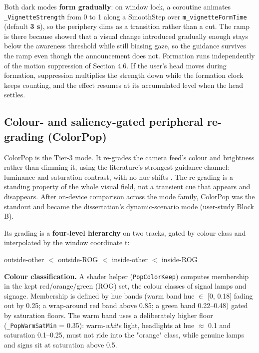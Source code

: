 Both dark modes \textbf{form gradually}: on window lock, a coroutine animates \verb|_VignetteStrength| from 0
to 1 along a SmoothStep over \verb|m_vignetteFormTime| (default \textbf{3 s}), so the periphery dims as a
transition rather than a cut. The ramp is there because \citet{hata2016} showed that a
visual change introduced gradually enough stays below the awareness threshold while still biasing
gaze, so the guidance survives the ramp even though the announcement does not. Formation runs independently of the motion suppression of Section 4.6.
If the user's head moves during formation, suppression multiplies the strength down while the
formation clock keeps counting, and the effect resumes at its accumulated level when the head
settles.

\subsection{Colour- and saliency-gated peripheral re-grading (ColorPop)}

ColorPop is the Tier-3 mode. It re-grades the camera feed's colour and brightness rather than
dimming it, using the literature's strongest guidance channel: luminance and saturation contrast,
with no hue shifts \citep{bailey2009,grogorick2017,sutton2022}. The re-grading
is a standing property of the whole visual field, not a transient cue that appears and disappears.
After on-device comparison across the mode family, ColorPop was the standout and became the
dissertation's dynamic-scenario mode (user-study Block B).

Its grading is a \textbf{four-level hierarchy} on two tracks, gated by colour class and interpolated by
the window coordinate t:

\begin{center}
outside-other $<$ outside-ROG $<$ inside-other $<$ inside-ROG
\end{center}

\textbf{Colour classification.} A shader helper (\verb|PopColorKeep|) computes membership in the kept
red/orange/green (ROG) set, the colour classes of signal lamps and signage. Membership is defined
by hue bands (warm band hue $\in$ [0, 0.18] fading out by 0.25; a wrap-around red band above 0.85; a
green band 0.22–0.48) gated by saturation floors. The warm band uses a deliberately higher floor
(\verb|_PopWarmSatMin| = 0.35): warm-\textit{white} light, headlights at hue $\approx$ 0.1 and saturation 0.1–0.25,
must not ride into the "orange" class, while genuine lamps and signs sit at saturation above 0.5.

